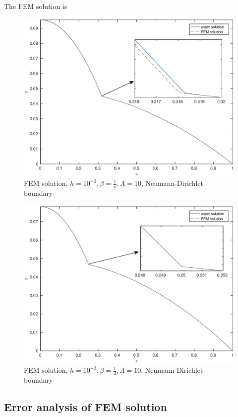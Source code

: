 \documentclass[12pt]{article}
\begin{document}
The FEM solution is
\begin{figure}[h!]
\centering
\includegraphics[scale=0.6]{FEM-pi-ND}
\caption{FEM solution, $h=10^{-3},\beta=\frac{1}{\pi},A=10$, Neumann-Dirichlet boundary}
\end{figure}
\pagebreak
\begin{figure}[h!]
\centering
\includegraphics[scale=0.6]{FEM-4-ND}
\caption{FEM solution, $h=10^{-3},\beta=\frac{1}{4},A=10$, Neumann-Dirichlet boundary}
\end{figure}

\subsection{Error analysis of FEM solution}
\end{document}
